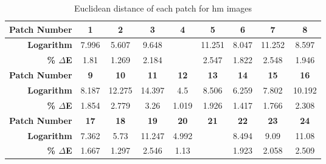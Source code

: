 \begin{table}[H]
  \caption{Euclidean distance of each patch for hm images }
  \begin{center}
    \begin{tabularx}{\textwidth}{r c c c c c c c c}
    \toprule
        \textbf{Patch Number} & \textbf{1} & \textbf{2} & \textbf{3} & \textbf{4} & \textbf{5} & \textbf{6} & \textbf{7} & \textbf{8}\\ \midrule 
        \textbf{Logarithm} &7.996 &5.607 &9.648 &\cellcolor{colorred}{15.072} &11.251 &8.047 &11.252 &8.597\\ 
        \textbf{\textbf{\% $\Delta$E}} &1.81 &1.269 &2.184 &\cellcolor{colorred}{3.412} &2.547 &1.822 &2.548 &1.946\\ \midrule 
        \textbf{Patch Number} & \textbf{9} & \textbf{10} & \textbf{11} & \textbf{12} & \textbf{13} & \textbf{14} & \textbf{15} & \textbf{16}\\ \midrule 
        \textbf{Logarithm} &8.187 &12.275 &14.397 &4.5 &8.506 &6.259 &7.802 &10.192\\ 
        \textbf{\textbf{\% $\Delta$E}} &1.854 &2.779 &3.26 &1.019 &1.926 &1.417 &1.766 &2.308\\ \midrule 
        \textbf{Patch Number} & \textbf{17} & \textbf{18} & \textbf{19} & \textbf{20} & \textbf{21} & \textbf{22} & \textbf{23} & \textbf{24}\\ \midrule 
        \textbf{Logarithm} &7.362 &5.73 &11.247 &4.992 &\cellcolor{colorgreen}{4.251} &8.494 &9.09 &11.08\\ 
        \textbf{\textbf{\% $\Delta$E}} &1.667 &1.297 &2.546 &1.13 &\cellcolor{colorgreen}{0.962} &1.923 &2.058 &2.509\\ \midrule 
    \bottomrule
    \end{tabularx}
  \end{center}
\end{table}
